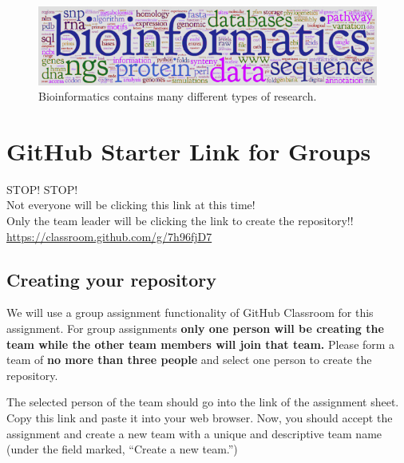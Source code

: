


\flushleft

\begin{figure}[ht!]
	\begin{center}
	 \includegraphics[scale=.7]{graphics/bioinfo.png}
	\end{center}
	\caption{Bioinformatics contains many different types of research.}
	\label{fig:bioinfo}
\end{figure}


\vspace*{-.1in}
\section*{GitHub Starter Link for Groups}
\vspace*{-.1in}
\begin{center}
\color{red}STOP! STOP!\\ Not everyone will be clicking this link at this time!\\ Only the team leader will be clicking the link to create the repository!!\\ \url{https://classroom.github.com/g/7h96fjD7}\color{black}
\end{center}

\subsection*{Creating your repository}

We will use a group assignment functionality
of GitHub Classroom for this assignment. For group assignments \textbf{only one person will be creating the team while the other team members will join that team.} Please form a team of \textbf{no more than three people} and select one person to create the repository.


The selected person of the team should go into the link of the assignment sheet. Copy this link and paste it into your web browser. Now, you should accept the assignment and create a new team with a unique and descriptive team name (under the field marked, ``Create a new team.'')

